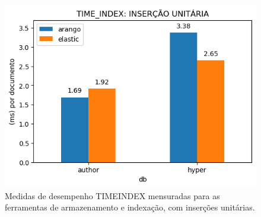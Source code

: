 \begin{figure}[ht]
    \centering
    \caption{Medidas de desempenho TIME\underscore{}INDEX mensuradas para as ferramentas de armazenamento e indexação, com inserções unitárias.}
    \vspace{-0.5cm}
    \begin{center}
        \includegraphics[scale=0.75]{img/time-index-individual.png}
    \end{center}
    \vspace{-0.5cm}
    \label{fig:time-index-individual}
\end{figure}